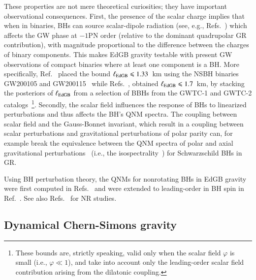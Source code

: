 \documentclass[twocolumn,
               prd,
               aps,
               superscriptaddress,
               tightenlines,
               nofootinbib,
               eqsecnum,
               amsfonts,
               amsmath,
               longbibliography]{revtex4-1}
\begin{document}
These properties are not mere theoretical curiosities; they have important observational consequences.
%
First, the presence of the scalar charge implies that when in binaries, BHs can source
scalar-dipole radiation (see, e.g., Refs.~\cite{Yagi:2011xp,Julie:2019sab,Shiralilou:2020gah,Shiralilou:2021mfl,Julie:2022huo})
which affects the GW phase at $-1$PN order (relative to the dominant quadrupolar GR
contribution), with magnitude proportional to the difference between the
charges of binary components. This makes EdGB gravity testable with present GW
observations of compact binaries where at least one component is a BH.
%
More specifically, Ref.~\cite{Lyu:2022gdr} placed the bound
%
$\ell_{\rm EdGB} \leqslant 1.33$~km
%
using the NSBH binaries GW200105 and
GW200115~\cite{LIGOScientific:2021qlt} while Refs.~\cite{Nair:2019iur,Perkins:2021mhb}, obtained
%
$\ell_{\rm EdGB} \leqslant 1.7$~km,
%
by stacking the posteriors of $\ell_{\rm EdGB}$ from a selection of BBHs
from the GWTC-1 and GWTC-2 catalogs~\cite{LIGOScientific:2018mvr,LIGOScientific:2020ibl}\footnote{These bounds
are, strictly speaking, valid only when the scalar field $\varphi$ is small (i.e., $\varphi \ll 1$), and
take into account only the leading-order scalar field contribution arising from the dilatonic coupling.}.
Secondly, the scalar field influences the response of BHs to linearized perturbations and thus
affects the BH's QNM spectra.
%
The coupling between scalar field and the Gauss-Bonnet invariant, which
result in a coupling between scalar perturbations and gravitational
perturbations of polar parity can, for example break the equivalence
between the QNM spectra of polar and axial gravitational perturbations~\cite{Glampedakis:2017rar,Lenzi:2021njy}
(i.e., the isospectrality~\cite{Chandrasekhar:1985kt}) for Schwarzschild BHs in GR.

Using BH perturbation theory, the QNMs for nonrotating BHs in EdGB gravity
were first computed in Refs.~\cite{Pani:2009wy,Blazquez-Salcedo:2016enn}
and were extended to leading-order in BH spin in Ref.~\cite{Pierini:2021jxd}.
%
See also Refs.~\cite{Witek:2018dmd,Okounkova:2019zep} for NR studies.

\subsection{Dynamical Chern-Simons gravity}
\label{sec:review_dcs}
\end{document}
